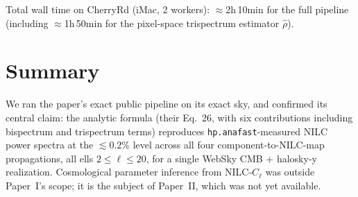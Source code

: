 \documentclass[11pt]{article}
\begin{document}
Total wall time on CherryRd (iMac, 2 workers): $\approx$2h\,10min for the
full pipeline (including $\approx$1h\,50min for the pixel-space trispectrum
estimator $\hat\rho$).

\section{Summary}

We ran the paper's exact public pipeline on its exact sky, and confirmed
its central claim: the analytic formula (their Eq.~26, with six
contributions including bispectrum and trispectrum terms) reproduces
\texttt{hp.anafast}-measured NILC power spectra at the $\lesssim 0.2\%$
level across all four component-to-NILC-map propagations, all ells
$2\le\ell\le 20$, for a single WebSky CMB + halosky-y realization.
Cosmological parameter inference from NILC-$C_\ell$ was outside Paper~I's
scope; it is the subject of Paper~II, which was not yet available.
\end{document}
